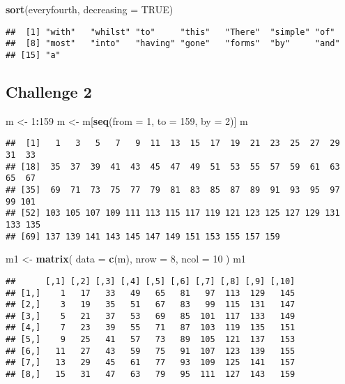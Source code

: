 \documentclass[]{article}
\newenvironment{Shaded}{\begin{snugshade}}{\end{snugshade}}
\newcommand{\DataTypeTok}[1]{\textcolor[rgb]{0.13,0.29,0.53}{#1}}
\newcommand{\DecValTok}[1]{\textcolor[rgb]{0.00,0.00,0.81}{#1}}
\newcommand{\KeywordTok}[1]{\textcolor[rgb]{0.13,0.29,0.53}{\textbf{#1}}}
\newcommand{\NormalTok}[1]{#1}
\newcommand{\OperatorTok}[1]{\textcolor[rgb]{0.81,0.36,0.00}{\textbf{#1}}}
\newcommand{\OtherTok}[1]{\textcolor[rgb]{0.56,0.35,0.01}{#1}}
\newcommand{\StringTok}[1]{\textcolor[rgb]{0.31,0.60,0.02}{#1}}
\begin{document}
\begin{Shaded}
\begin{Highlighting}[]
\KeywordTok{sort}\NormalTok{(everyfourth, }\DataTypeTok{decreasing =} \OtherTok{TRUE}\NormalTok{)}
\end{Highlighting}
\end{Shaded}

\begin{verbatim}
##  [1] "with"   "whilst" "to"     "this"   "There"  "simple" "of"    
##  [8] "most"   "into"   "having" "gone"   "forms"  "by"     "and"   
## [15] "a"
\end{verbatim}

\hypertarget{challenge-2}{%
\subsection{Challenge 2}\label{challenge-2}}

\begin{Shaded}
\begin{Highlighting}[]
\NormalTok{m <-}\StringTok{ }\DecValTok{1}\OperatorTok{:}\DecValTok{159}
\NormalTok{m <-}\StringTok{ }\NormalTok{m[}\KeywordTok{seq}\NormalTok{(}\DataTypeTok{from =} \DecValTok{1}\NormalTok{, }\DataTypeTok{to =} \DecValTok{159}\NormalTok{, }\DataTypeTok{by =} \DecValTok{2}\NormalTok{)]}
\NormalTok{m}
\end{Highlighting}
\end{Shaded}

\begin{verbatim}
##  [1]   1   3   5   7   9  11  13  15  17  19  21  23  25  27  29  31  33
## [18]  35  37  39  41  43  45  47  49  51  53  55  57  59  61  63  65  67
## [35]  69  71  73  75  77  79  81  83  85  87  89  91  93  95  97  99 101
## [52] 103 105 107 109 111 113 115 117 119 121 123 125 127 129 131 133 135
## [69] 137 139 141 143 145 147 149 151 153 155 157 159
\end{verbatim}

\begin{Shaded}
\begin{Highlighting}[]
\NormalTok{m1 <-}\StringTok{ }\KeywordTok{matrix}\NormalTok{(}
  \DataTypeTok{data =} \KeywordTok{c}\NormalTok{(m),}
  \DataTypeTok{nrow =} \DecValTok{8}\NormalTok{,}
  \DataTypeTok{ncol =} \DecValTok{10}
\NormalTok{  )}
\NormalTok{m1}
\end{Highlighting}
\end{Shaded}

\begin{verbatim}
##      [,1] [,2] [,3] [,4] [,5] [,6] [,7] [,8] [,9] [,10]
## [1,]    1   17   33   49   65   81   97  113  129   145
## [2,]    3   19   35   51   67   83   99  115  131   147
## [3,]    5   21   37   53   69   85  101  117  133   149
## [4,]    7   23   39   55   71   87  103  119  135   151
## [5,]    9   25   41   57   73   89  105  121  137   153
## [6,]   11   27   43   59   75   91  107  123  139   155
## [7,]   13   29   45   61   77   93  109  125  141   157
## [8,]   15   31   47   63   79   95  111  127  143   159
\end{verbatim}
\end{document}
